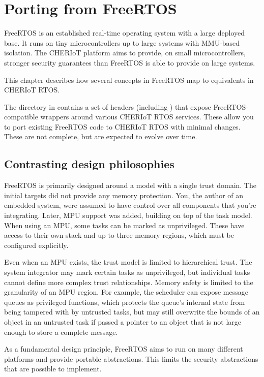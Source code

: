 \chapter[label=from_freertos]{Porting from FreeRTOS}

FreeRTOS is an established real-time operating system with a large deployed base.
It runs on tiny microcontrollers up to large systems with MMU-based isolation.
The CHERIoT platform aims to provide, on small microcontrollers, stronger security guarantees than FreeRTOS is able to provide on large systems.

This chapter describes how several concepts in FreeRTOS map to equivalents in CHERIoT RTOS.

The  directory in  contains a set of headers (including ) that expose FreeRTOS-compatible wrappers around various CHERIoT RTOS services.
These allow you to port existing FreeRTOS code to CHERIoT RTOS with minimal changes.
These are not complete, but are expected to evolve over time.

\section{Contrasting design philosophies}

FreeRTOS is primarily designed around a model with a single trust domain.
The initial targets did not provide any memory protection.
You, the author of an embedded system, were assumed to have control over all components that you're integrating.
Later, MPU support was added, building on top of the task model.
When using an MPU, some tasks can be marked as unprivileged.
These have access to their own stack and up to three memory regions, which must be configured explicitly.

Even when an MPU exists, the trust model is limited to hierarchical trust.
The system integrator may mark certain tasks as unprivileged, but individual tasks cannot define more complex trust relationships.
Memory safety is limited to the granularity of an MPU region.
For example, the scheduler can expose message queues as privileged functions, which protects the queue's internal state from being tampered with by untrusted tasks, but may still overwrite the bounds of an object in an untrusted task if passed a pointer to an object that is not large enough to store a complete message.

As a fundamental design principle, FreeRTOS aims to run on many different platforms and provide portable abstractions.
This limits the security abstractions that are possible to implement.

